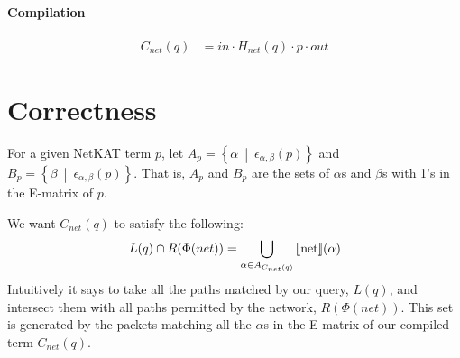\documentclass[12pt]{article}
\newcommand{\setst}[2]{\left\{#1 \>\middle|\> #2 \right\}}
\newcommand{\denote}[1]{\text{$[\![ $#1$ ]\!]$}}
\begin{document}
\paragraph{Compilation}
\begin{align*}
  C_{net}(q) &= in \cdot H_{net}(q) \cdot p \cdot out
\end{align*}

\section{Correctness}
For a given NetKAT term $p$, let $A_p = \setst{\alpha}{\epsilon_{\alpha,
\beta}(p)}$ and $B_p = \setst{\beta}{\epsilon_{\alpha, \beta}(p)}$. That is,
$A_p$ and $B_p$ are the sets of $\alpha$s and $\beta$s with 1's in the E-matrix
of $p$.

We want $C_{net}(q)$ to satisfy the following:
\[
  L(q) \cap R(\Phi(net)) = \bigcup_{\alpha \in A_{C_{net}(q)}}{\denote{net}(\alpha)}
\]
Intuitively it says to take all the paths matched by our query, $L(q)$, and
intersect them with all paths permitted by the network, $R(\Phi(net))$. This
set is generated by the packets matching all the $\alpha$s in the E-matrix of
our compiled term $C_{net}(q)$.
\end{document}
